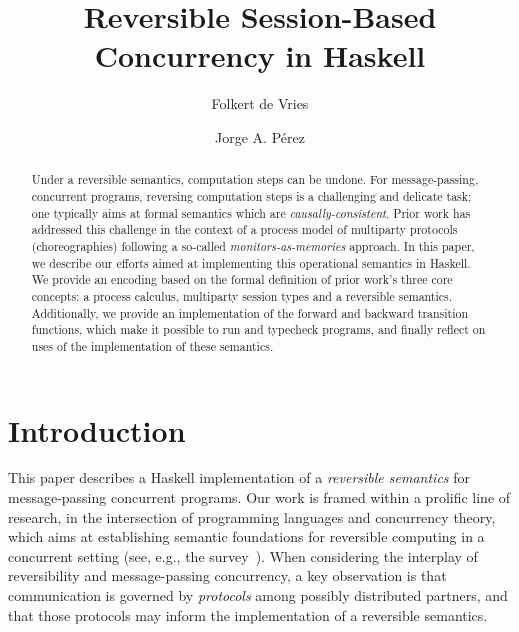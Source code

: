 \documentclass[runningheads,plain]{llncs}
\begin{document}
\title{Reversible Session-Based Concurrency in Haskell}

\author{Folkert de Vries \and
Jorge A. P\'{e}rez%
}
%
%
\maketitle



\begin{abstract}
Under a reversible semantics, computation steps can be undone. For
message-passing, concurrent programs, reversing computation steps is a
challenging and delicate task; one typically aims at formal semantics
which are \emph{causally-consistent}. Prior work has addressed this
challenge in the context of a process model of multiparty protocols
(choreographies) following a so-called \emph{monitors-as-memories}
approach. In this paper, we describe our efforts aimed at implementing
this operational semantics in Haskell. We provide an encoding based on
the formal definition of prior work's three core concepts: a process
calculus, multiparty session types and a reversible semantics.
Additionally, we provide an implementation of the forward and backward
transition functions, which make it possible to run and typecheck
programs, and finally reflect on uses of the implementation of these
semantics. 
\end{abstract}





\section{Introduction}
This paper describes a Haskell implementation of 
a \emph{reversible semantics} for message-passing concurrent programs. 
Our work is framed within a prolific line of research, 
in the intersection of programming languages and concurrency theory,
which aims at  
establishing  semantic foundations for reversible computing in a 
concurrent setting (see, e.g., the survey~\cite{DBLP:journals/eatcs/Lanese14}).
When considering the interplay of reversibility and message-passing concurrency, 
a key observation  is that
 communication is governed by
\emph{protocols} among possibly distributed partners, and that 
 those protocols may inform the implementation of a reversible semantics.
\end{document}
